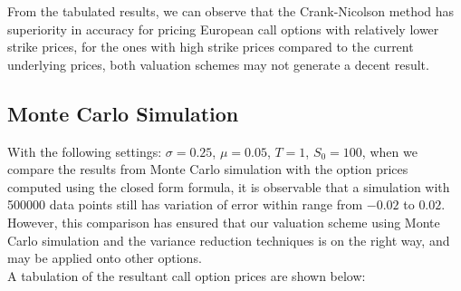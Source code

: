 From the tabulated results, we can observe that the Crank-Nicolson method has superiority in accuracy for pricing European call options with relatively lower strike prices, for the ones with high strike prices compared to the current underlying prices, both valuation schemes may not generate a decent result.
\newpage

\subsection{Monte Carlo Simulation}
With the following settings: $\sigma = 0.25$, $\mu = 0.05$, $T = 1$, $S_{0} = 100$, 
when we compare the results from Monte Carlo simulation with the option prices computed using the closed form formula, it is observable that a simulation with 500000 data points still has variation of error within range from $-0.02$ to $0.02$. However, this comparison has ensured that our valuation scheme using Monte Carlo simulation and the variance reduction techniques is on the right way, and may be applied onto other options.\\[1mm]
A tabulation of the resultant call option prices are shown below:
